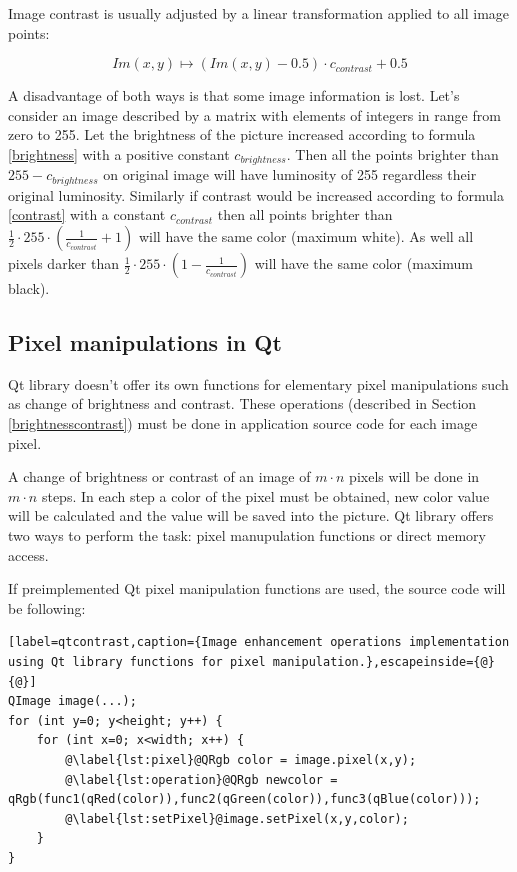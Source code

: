Image contrast is usually adjusted by a linear transformation applied to all image points:

\begin{equation}
\label{contrast}
  Im(x,y) \longmapsto   (Im(x,y) - 0.5) \cdot c_{contrast} + 0.5
\end{equation}

A disadvantage of both ways is that some image information is lost. Let's consider an image described by a matrix with elements of integers in range from zero to 255. Let the brightness of the picture increased according to formula \eqref{brightness} with a positive constant $ c_{brightness} $. Then all the points brighter than $ 255 - c_{brightness} $ on original image will have luminosity of 255 regardless their original luminosity. Similarly if contrast would be increased according to formula \eqref{contrast} with a constant $ c_{contrast} $ then all points brighter than $ \frac{1}{2} \cdot 255 \cdot (\frac{1}{c_{contrast}}+1) $ will have the same color (maximum white). As well all pixels darker than $ \frac{1}{2} \cdot 255 \cdot (1 - \frac{1}{c_{contrast}}) $ will have the same color (maximum black).


\subsection{Pixel manipulations in Qt}

Qt library doesn't offer its own functions for elementary pixel manipulations such as change of brightness and contrast. These operations (described in Section \ref{brightnesscontrast}) must be done in application source code for each image pixel.

A change of brightness or contrast of an image of $m \cdot n$ pixels will be done in $m \cdot n$ steps. In each step a color of the pixel must be obtained, new color value will be calculated and the value will be saved into the picture. Qt library offers two ways to perform the task: pixel manupulation functions or direct memory access.

If preimplemented Qt pixel manipulation functions are used, the source code will be following:

\begin{lstlisting}[label=qtcontrast,caption={Image enhancement operations implementation using Qt library functions for pixel manipulation.},escapeinside={@}{@}]
QImage image(...);
for (int y=0; y<height; y++) {
	for (int x=0; x<width; x++) {
		@\label{lst:pixel}@QRgb color = image.pixel(x,y);
		@\label{lst:operation}@QRgb newcolor = qRgb(func1(qRed(color)),func2(qGreen(color)),func3(qBlue(color)));
		@\label{lst:setPixel}@image.setPixel(x,y,color);
	}
}
\end{lstlisting}

